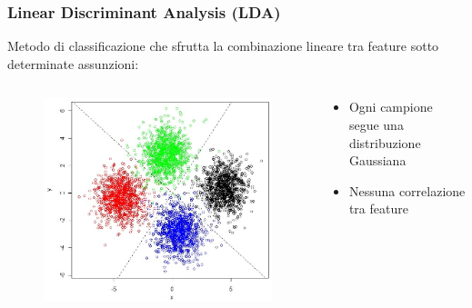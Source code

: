 \documentclass{beamer}
\begin{document}
\begin{frame}
	\frametitle{Linear Discriminant Analysis (LDA)}
	Metodo di classificazione che sfrutta la combinazione lineare tra feature sotto determinate assunzioni:
	\begin{columns}[c]
		\begin{column}{.5\textwidth}
			\begin{figure}[htb]
				\vspace{-0.2cm}
				\includegraphics[width=1\textwidth]{figure/LDA.png}
			\end{figure}
		\end{column}
		\begin{column}{.5\textwidth}
			\begin{itemize}
				\item Ogni campione segue una distribuzione Gaussiana
				\item Nessuna correlazione tra feature
			\end{itemize}
		\end{column}
	\end{columns}
\end{frame}
\end{document}
